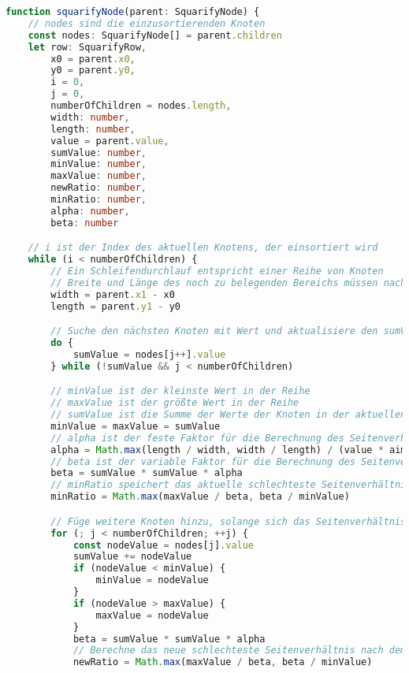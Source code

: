 \begin{lstlisting}[language=typescript, caption={Vereinfachte und kommentierte Grundlage für den Algorithmus der in dieser Arbeit hauptsächlich verwendet wird}, label={lst:squarify_code}]
function squarifyNode(parent: SquarifyNode) {
    // nodes sind die einzusortierenden Knoten
    const nodes: SquarifyNode[] = parent.children
    let row: SquarifyRow,
        x0 = parent.x0,
        y0 = parent.y0,
        i = 0,
        j = 0,
        numberOfChildren = nodes.length,
        width: number,
        length: number,
        value = parent.value,
        sumValue: number,
        minValue: number,
        maxValue: number,
        newRatio: number,
        minRatio: number,
        alpha: number,
        beta: number

    // i ist der Index des aktuellen Knotens, der einsortiert wird
    while (i < numberOfChildren) {
        // Ein Schleifendurchlauf entspricht einer Reihe von Knoten
        // Breite und Länge des noch zu belegenden Bereichs müssen nach jeder Reihe neu berechnet werden
        width = parent.x1 - x0
        length = parent.y1 - y0

        // Suche den nächsten Knoten mit Wert und aktualisiere den sumValue
        do {
            sumValue = nodes[j++].value
        } while (!sumValue && j < numberOfChildren)

        // minValue ist der kleinste Wert in der Reihe
        // maxValue ist der größte Wert in der Reihe
        // sumValue ist die Summe der Werte der Knoten in der aktuellen Reihe
        minValue = maxValue = sumValue
        // alpha ist der feste Faktor für die Berechnung des Seitenverhältnisses
        alpha = Math.max(length / width, width / length) / (value * aimedRatio)
        // beta ist der variable Faktor für die Berechnung des Seitenverhältnisses
        beta = sumValue * sumValue * alpha
        // minRatio speichert das aktuelle schlechteste Seitenverhältnis in der Reihe
        minRatio = Math.max(maxValue / beta, beta / minValue)

        // Füge weitere Knoten hinzu, solange sich das Seitenverhältnis nicht verschlechtert
        for (; j < numberOfChildren; ++j) {
            const nodeValue = nodes[j].value
            sumValue += nodeValue
            if (nodeValue < minValue) {
                minValue = nodeValue
            }
            if (nodeValue > maxValue) {
                maxValue = nodeValue
            }
            beta = sumValue * sumValue * alpha
            // Berechne das neue schlechteste Seitenverhältnis nach dem Hinzufügen des Knotens
            newRatio = Math.max(maxValue / beta, beta / minValue)


\end{lstlisting}
